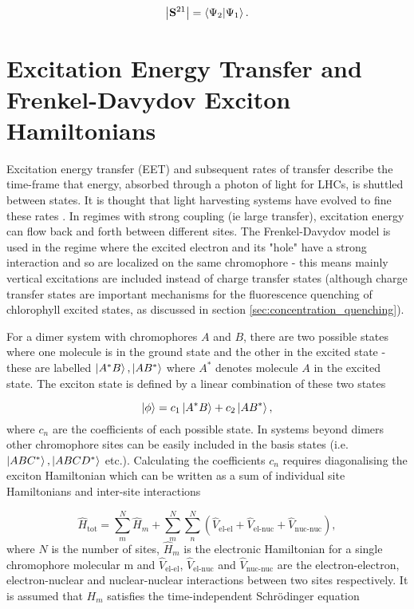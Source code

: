 \begin{equation}
\left\lvert {\mathbf{S}^{21}} \right\rvert = \braket{\Psi_2|\Psi_1}.
\end{equation}
%

\section{Excitation Energy Transfer and Frenkel-Davydov Exciton Hamiltonians}
\label{sec:frenkel_exciton_theory}

Excitation energy transfer (EET) and subsequent rates of transfer describe the time-frame
that energy, absorbed through a photon of light for LHCs, is shuttled between states.
It is thought that light harvesting systems have evolved to fine these rates \cite{Cleary2013}.
In regimes with strong coupling (ie large transfer), excitation energy can flow back
and forth between different sites. The Frenkel-Davydov model \cite{Frenkel1931, Davydov1964}
is used in the regime where the excited electron and its "hole" have a strong interaction
and so are localized on the same chromophore - this means mainly vertical excitations
are included instead of charge transfer states (although charge transfer states
are important mechanisms for the fluorescence quenching of chlorophyll excited states,
as discussed in section \ref{sec:concentration_quenching}).

For a dimer system with chromophores $A$ and $B$, there are two possible states 
where one molecule is in the ground state and the other in the excited state - these 
are labelled $\ket{A^*B}, \ket{AB^*}$ where $A^*$ denotes molecule $A$ in the excited
state. The exciton state is defined by a linear combination of these two states

\begin{equation}
\ket{\phi} = c_1 \ket{A^*B} + c_2 \ket{AB^*},
\end{equation}
%
where $c_n$ are the coefficients of each possible state. In systems beyond dimers 
other chromophore sites can be easily included in the basis states (i.e. $\ket{ABC^*}, 
\ket{ABCD^*}$ etc.). Calculating the coefficients $c_n$ requires diagonalising the
exciton Hamiltonian which can be written as a sum of individual site Hamiltonians 
and inter-site interactions

\begin{equation}
\hat{H}_{\text{tot}} = \sum^N_m \hat{H}_m + \sum^N_m \sum^N_n \left(\hat{V}_{\text{el-el}} + \hat{V}_{\text{el-nuc}} + \hat{V}_{\text{nuc-nuc}}\right),
\end{equation}
%
where $N$ is the number of sites, $\hat{H}_m$ is the electronic Hamiltonian for 
a single chromophore molecular m and $\hat{V}_{\text{el-el}}$, $\hat{V}_{\text{el-nuc}}$ 
and $\hat{V}_{\text{nuc-nuc}}$ are the electron-electron, electron-nuclear and nuclear-nuclear
interactions between two sites respectively. It is assumed that $H_m$ satisfies
the time-independent Schrödinger equation

